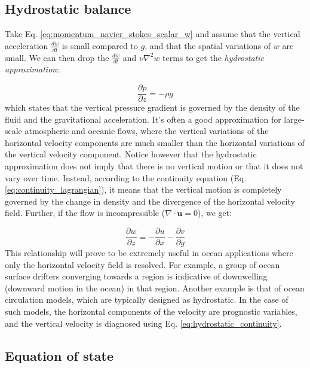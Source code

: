 \documentclass[12pt]{article}
\numberwithin{equation}{section}
\numberwithin{figure}{section}
\numberwithin{table}{section}
\begin{document}
\subsection{Hydrostatic balance}

Take Eq. \ref{eq:momentum_navier_stokes_scalar_w} and assume that the vertical
acceleration $\frac{dw}{dt}$ is small compared to $g$, and that the spatial
variations of $w$ are small.
We can then drop the $\frac{dw}{dt}$ and $\nu \nabla^2 w$ terms to get the
\textit{hydrostatic approximation}:

\begin{equation}
  \frac{\partial p}{\partial z} = - \rho g
  \label{eq:hydrostatic_approximation}
\end{equation}
which states that the vertical pressure gradient is governed by the density
of the fluid and the gravitational acceleration.
It's often a good approximation for large-scale atmospheric and oceanic flows,
where the vertical variations of the horizontal velocity components are much
smaller than the horizontal variations of the vertical velocity component.
Notice however that the hydrostatic approximation does not imply that there
is no vertical motion or that it does not vary over time.
Instead, according to the continuity equation (Eq. \ref{eq:continuity_lagrangian}),
it means that the vertical motion is completely governed by the change in
density and the divergence of the horizontal velocity field.
Further, if the flow is incompressible ($\nabla \cdot \mathbf{u} = 0$),
we get:

\begin{equation}
  \frac{\partial w}{\partial z} = - \frac{\partial u}{\partial x} - \frac{\partial v}{\partial y}
  \label{eq:hydrostatic_continuity}
\end{equation}
This relationship will prove to be extremely useful in ocean applications where
only the horizontal velocity field is resolved.
For example, a group of ocean surface drifters converging towards a region is
indicative of downwelling (downward motion in the ocean) in that region.
Another example is that of ocean circulation models, which are typically
designed as hydrostatic.
In the case of such models, the horizontal components of the velocity are
prognostic variables, and the vertical velocity is diagnosed using
Eq. \ref{eq:hydrostatic_continuity}.

\subsection{Equation of state}
\end{document}
